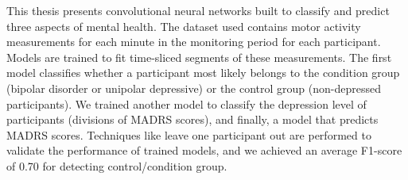 This thesis presents convolutional neural networks built to classify and predict three aspects of mental health. The dataset used contains motor activity measurements for each minute in the monitoring period for each participant. Models are trained to fit time-sliced segments of these measurements. The first model classifies whether a participant most likely belongs to the condition group (bipolar disorder or unipolar depressive) or the control group (non-depressed participants). We trained another model to classify the depression level of participants (divisions of MADRS scores), and finally, a model that predicts MADRS scores. Techniques like leave one participant out are performed to validate the performance of trained models, and we achieved an average F1-score of 0.70 for detecting control/condition group.